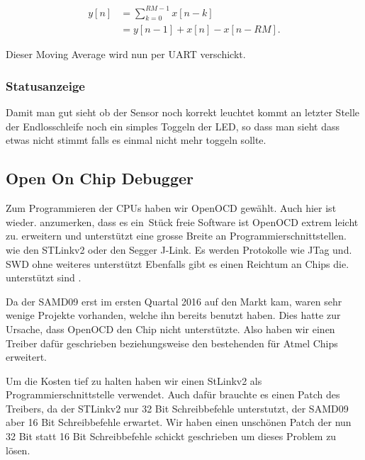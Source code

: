 \begin{equation}\label{eq:hogenauer}
    \begin{split}
        y[n] &= \sum_{k=0}^{RM-1} x[n-k] \\
             &= y[n-1] + x[n] - x[n-RM].
    \end{split}
\end{equation}

Dieser Moving Average wird nun per UART verschickt.

\subsubsection{Statusanzeige}
\label{subs:Statusanzeige}

Damit  man gut  sieht ob  der Sensor  noch korrekt  leuchtet kommt  an letzter
Stelle der Endlosschleife noch ein simples  Toggeln der LED, so dass man sieht
dass etwas nicht stimmt falls es einmal nicht mehr toggeln sollte.

\subsection{Open On Chip Debugger}

Zum Programmieren der CPUs haben  wir OpenOCD gew\"ahlt. Auch hier ist wieder.
anzumerken, dass es ein St\"uck freie  Software ist OpenOCD extrem leicht zu.
erweitern und  unterst\"utzt eine grosse Breite  an Programmierschnittstellen.
wie den  STLinkv2 oder den Segger  J-Link. Es werden Protokolle wie  JTag und.
SWD ohne weiteres unterst\"utzt Ebenfalls gibt es einen Reichtum an Chips die.
unterst\"utzt sind                                                           .

Da  der SAMD09  erst im  ersten Quartal  2016 auf  den Markt  kam, waren  sehr
wenige Projekte  vorhanden, welche ihn  bereits benutzt haben. Dies  hatte zur
Ursache,  dass OpenOCD  den Chip  nicht unterst\"utzte. Also  haben wir  einen
Treiber daf\"ur geschrieben beziehungsweise  den bestehenden f\"ur Atmel Chips
erweitert.

Um   die   Kosten   tief   zu    halten   haben   wir   einen   StLinkv2   als
Programmierschnittstelle verwendet. Auch  daf\"ur brauchte es einen  Patch des
Treibers, da  der STLinkv2 nur  32 Bit Schreibbefehle unterstutzt,  der SAMD09
aber 16 Bit Schreibbefehle erwartet. Wir haben einen unsch\"onen Patch der nun
32 Bit  statt 16 Bit Schreibbefehle  schickt geschrieben um dieses  Problem zu
l\"osen.
